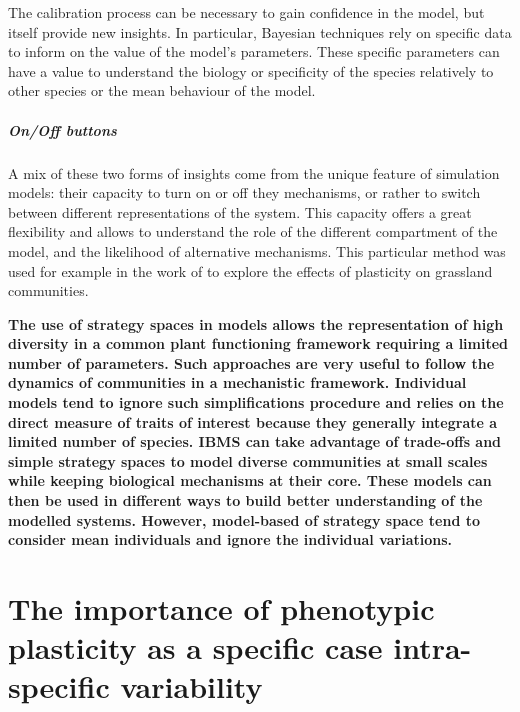 The calibration process can be necessary to gain confidence in the model, but itself provide new insights. In particular, Bayesian techniques rely on specific data to inform on the value of the model's parameters. These specific parameters can have a value to understand the biology or specificity of the species relatively to other species or the mean behaviour of the model.

\paragraph{On/Off buttons}

A mix of these two forms of insights come from the unique feature of simulation models: their capacity 	to turn on or off they mechanisms, or rather to switch between different representations of the system. This capacity offers a great flexibility and allows to understand the role of the different compartment of the model, and the likelihood of alternative mechanisms. This particular method was used for example in the work of \cite{maire_plasticity_2013} to explore the effects of plasticity on grassland communities.

%
%



\textbf{The use of strategy spaces in models allows the representation of high diversity in a common plant functioning framework requiring a limited number of parameters. Such approaches are very useful to follow the dynamics of communities in a mechanistic framework. Individual models tend to ignore such simplifications procedure and relies on the direct measure of traits of interest because they generally integrate a limited number of species. IBMS can take advantage of trade-offs and simple strategy spaces to model diverse communities at small scales while keeping biological mechanisms at their core. These models can then be used in different ways to build better understanding of the modelled systems. However, model-based of strategy space tend to consider mean individuals and ignore the individual variations.}


\chapter{The importance of phenotypic plasticity as a specific case intra-specific variability}\label{chapter:PP_ISV}

